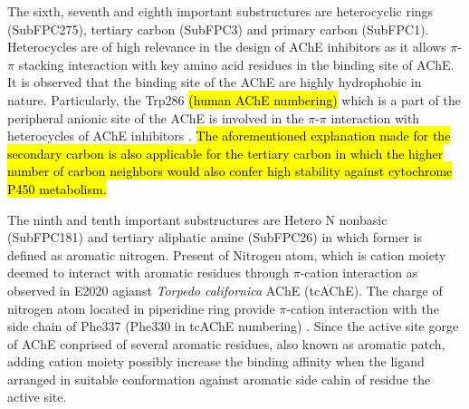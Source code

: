 \documentclass[fleqn,10pt]{wlpeerj}
\begin{document}
The sixth, seventh and eighth important substructures are heterocyclic rings (SubFPC275), tertiary carbon (SubFPC3) and primary carbon (SubFPC1). Heterocycles are of high relevance in the design of AChE inhibitors as it allows $\pi$-$\pi$ stacking interaction with key amino acid residues in the binding site of AChE. It is observed that the binding site of the AChE are highly hydrophobic in nature. Particularly, the Trp286 \hl{(human AChE numbering)} which is a part of the peripheral anionic site of the AChE is involved in the $\pi$-$\pi$ interaction with heterocycles of AChE inhibitors \citep{lu2011discovery}. \hl{The aforementioned explanation made for the secondary carbon is also applicable for the tertiary carbon in which the higher number of carbon neighbors would also confer high stability against cytochrome P450 metabolism.}

The ninth and tenth important substructures are Hetero N nonbasic (SubFPC181) and tertiary aliphatic amine (SubFPC26) in which former is defined as aromatic nitrogen. Present of Nitrogen atom, which is cation moiety deemed to interact with aromatic residues through $\pi$-cation interaction as observed in E2020 agianst \textit{Torpedo californica} AChE (tcAChE). The charge of nitrogen atom located in piperidine ring provide $\pi$-cation interaction with the side chain of Phe337 (Phe330 in tcAChE numbering) \citep{doi:10.1021/jm049695v}. Since the active site gorge of AChE conprised of several aromatic residues, also known as aromatic patch, adding cation moiety possibly increase the binding affinity when the ligand arranged in suitable conformation against aromatic side cahin of residue the active site.
\end{document}
